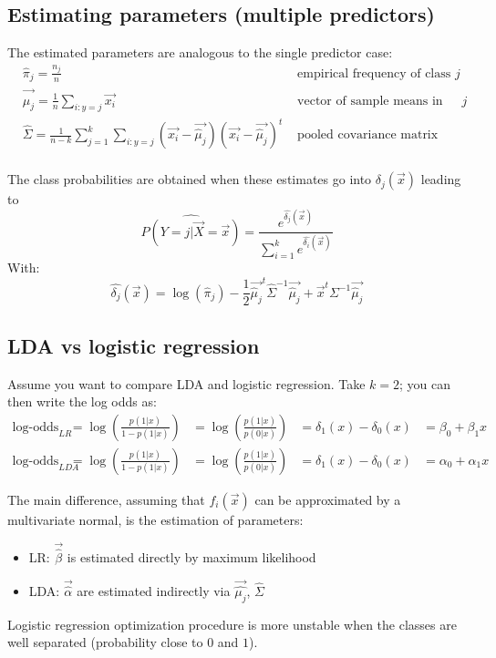     \subsection{Estimating parameters (multiple predictors)}
      The estimated parameters are analogous to the single predictor case:
      \begin{align*}
      &\hat{\pi}_j = \frac{n_j}{n}
      & \text{ empirical frequency of class } j\\
      & \vec{\hat{\mu}_j}=\frac{1}{n}\sum_{i:y=j}\vec{x_i}
      & \text{ vector of sample means in class } j\\
      &\hat{\Sigma} = \frac{1}{n-k} \sum_{j=1}^{k}\sum_{i:y=j}(\vec{x_i}-\vec{\hat{\mu}_j})(\vec{x_i}-\vec{\hat{\mu}_j})^t
      & \text{ pooled covariance matrix}\\
      \end{align*}
      
      The class probabilities are obtained when these estimates go into $\delta_j(\vec{x})$ leading to
      $$\hat{P(Y=j|\vec{X}=\vec{x})} = \frac{e^{\hat{\delta_j}(\vec{x})}}{\sum_{i=1}^{k}e^{\hat{\delta_i}(\vec{x})}}$$
      With:
      $$\hat{\delta_j}(\vec{x}) = \log(\hat{\pi}_j) - \frac{1}{2}\vec{\hat{\mu}_j}^t\hat{\Sigma}^{-1}\vec{\hat{\mu}_j} + \vec{x}^t \Sigma^{-1}\vec{\hat{\mu}_j}$$

    \subsection{LDA vs logistic regression}
      Assume you want to compare LDA and logistic regression. Take $k=2$; you can then write the log odds as:
      \begin{align*}
      \text{log-odds}_{LR}
      &= \log\left(\frac{p(1|x)}{1-p(1|x)}\right)
      &= \log\left(\frac{p(1|x)}{p(0|x)}\right)
      &= \delta_1(x)-\delta_0(x)
      &= \beta_0+\beta_1x\\
      \text{log-odds}_{LDA}
      &= \log\left(\frac{p(1|x)}{1-p(1|x)}\right)
      &= \log\left(\frac{p(1|x)}{p(0|x)}\right)
      &= \delta_1(x)-\delta_0(x)
      &= \alpha_0+\alpha_1x
      \end{align*}

      The main difference, assuming that $f_i(\vec{x})$ can be approximated by a multivariate normal, is the estimation of parameters:
      \begin{itemize}
        \item LR: $\vec{\hat{\beta}}$ is estimated directly by maximum likelihood 
        \item LDA: $\vec{\hat{\alpha}}$ are estimated indirectly via $\vec{\hat{\mu_j}}$, $\hat{\Sigma}$
      \end{itemize}
      Logistic regression optimization procedure is more unstable when the classes are well separated (probability close to $0$ and $1$).

